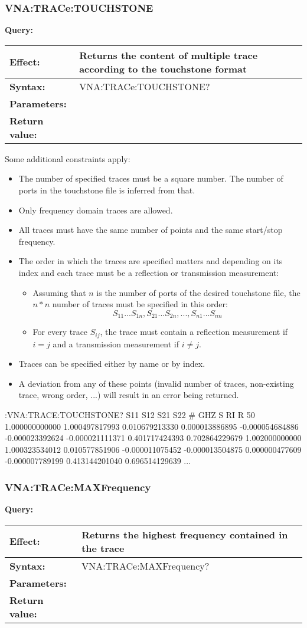 \documentclass[a4paper,11pt]{article}
\newcommand{\query}[4]{
\noindent\textbf{Query:}
\begin{longtable}{p{.15\textwidth} | p{.80\textwidth} } 
\hline
\textbf{Effect:} & #1 \\ \hline
\textbf{Syntax:} & #2 \\ \hline 
\textbf{Parameters:} & \makecell[tl]{#3} \\ \hline
\textbf{Return value:} & \makecell[tl]{#4} \\ \hline
\end{longtable}
}
\begin{document}
\subsubsection{VNA:TRACe:TOUCHSTONE}
\query{Returns the content of multiple trace according to the touchstone format}{VNA:TRACe:TOUCHSTONE?}{<trace1>,<trace2>,<trace3>,...}{Touchstone file content in ASCII}
Some additional constraints apply:
\begin{itemize}
\item The number of specified traces must be a square number. The number of ports in the touchstone file is inferred from that.
\item Only frequency domain traces are allowed.
\item All traces must have the same number of points and the same start/stop frequency.
\item The order in which the traces are specified matters and depending on its index and each trace must be a reflection or transmission measurement:
\begin{itemize}
\item Assuming that $n$ is the number of ports of the desired touchstone file, the $n*n$ number of traces must be specified in this order:
$$ S_{11}...S_{1n},S_{21}...S_{2n},...,S_{n1}...S_{nn} $$
\item For every trace $S_{ij}$, the trace must contain a reflection measurement if $i=j$ and a transmission measurement if $i\neq j$.
\end{itemize}
\item Traces can be specified either by name or by index.
\item A deviation from any of these points (invalid number of traces, non-existing trace, wrong order, ...) will result in an error being returned.
\end{itemize}
\begin{example}
:VNA:TRACE:TOUCHSTONE? S11 S12 S21 S22
# GHZ S RI R 50
1.000000000000 1.000497817993 0.010679213330 0.000013886895 -0.000054684886 -0.000023392624 -0.000021111371 0.401717424393 0.702864229679
1.002000000000 1.000323534012 0.010577851906 -0.000011075452 -0.000013504875 0.000000477609 -0.000007789199 0.413144201040 0.696514129639
...
\end{example}

\subsubsection{VNA:TRACe:MAXFrequency}
\query{Returns the highest frequency contained in the trace}{VNA:TRACe:MAXFrequency?}{<trace>, either by name or by index}{maximum frequency in Hz}
\end{document}
